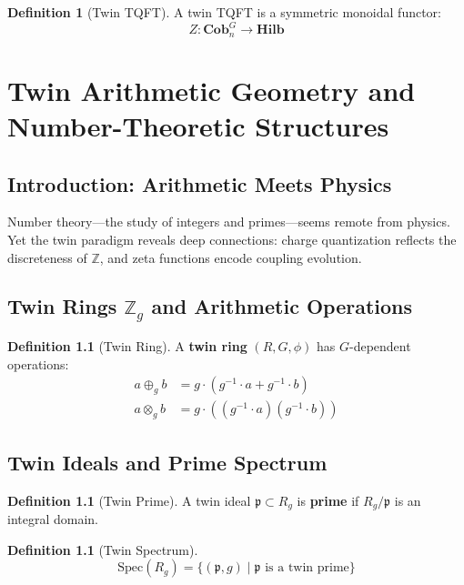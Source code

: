 \documentclass[11pt,a4paper,openright]{book}
\theoremstyle{plain}
\theoremstyle{definition}
\newtheorem{definition}[theorem]{Definition}
\newcommand{\Spec}{\mathrm{Spec}}
\newcommand{\Z}{\mathbb{Z}}
\newcommand{\Hilb}{\mathbf{Hilb}}
\begin{document}
\begin{definition}[Twin TQFT]
A twin TQFT is a symmetric monoidal functor:
\begin{equation}
Z: \mathbf{Cob}_n^G \to \Hilb
\end{equation}
\end{definition}

\chapter{Twin Arithmetic Geometry and Number-Theoretic Structures}
\label{ch:arithmetic}

\section{Introduction: Arithmetic Meets Physics}

Number theory---the study of integers and primes---seems remote from physics. Yet the twin paradigm reveals deep connections: charge quantization reflects the discreteness of $\Z$, and zeta functions encode coupling evolution.

\section{Twin Rings $\Z_g$ and Arithmetic Operations}

\begin{definition}[Twin Ring]
A \textbf{twin ring} $(R, G, \phi)$ has $G$-dependent operations:
\begin{align}
a \oplus_g b &= g \cdot (g^{-1} \cdot a + g^{-1} \cdot b) \\
a \otimes_g b &= g \cdot ((g^{-1} \cdot a)(g^{-1} \cdot b))
\end{align}
\end{definition}

\section{Twin Ideals and Prime Spectrum}

\begin{definition}[Twin Prime]
A twin ideal $\mathfrak{p} \subset R_g$ is \textbf{prime} if $R_g/\mathfrak{p}$ is an integral domain.
\end{definition}

\begin{definition}[Twin Spectrum]
\begin{equation}
\Spec(R_g) = \{(\mathfrak{p}, g) \mid \mathfrak{p} \text{ is a twin prime}\}
\end{equation}
\end{definition}
\end{document}
